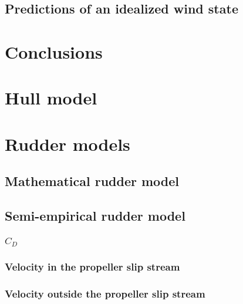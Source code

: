 \documentclass[preprint,12pt,authoryear]{elsarticle}
\begin{document}
\subsection{Predictions of an idealized wind state}
\label{sec:idealized_wind_state}

\FloatBarrier
%


%
\section{Conclusions}
\label{sec:conclusions}

\FloatBarrier


\appendix
\section{Hull model}
\label{sec:hull}

%
\section{Rudder models}
\label{sec:rudder_models}
\subsection{Mathematical rudder model}
\label{sec:mathematical_rudder_model}

\subsection{Semi-empirical rudder model}
\label{sec:semi-empirical_rudder_model}
%
\subsubsection{$C_D$}
\label{sec:CD}

\subsubsection{Velocity in the propeller slip stream}
\label{sec:velocity_in_the_propeller_slip_stream}

\subsubsection{Velocity outside the propeller slip stream}
\label{sec:velocity_outside_the_propeller_slip_stream}


\FloatBarrier
\pagebreak


\end{document}

